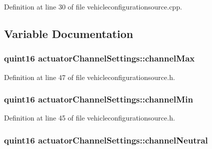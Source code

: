 \-Definition at line 30 of file vehicleconfigurationsource.\-cpp.



\subsection{\-Variable \-Documentation}
\hypertarget{group___vehicle_configuration_source_ga204a4e4648453d51e42ad2b82cb68fa8}{
\subsubsection[{channel\-Max}]{\setlength{\rightskip}{0pt plus 5cm}quint16 {\bf actuator\-Channel\-Settings\-::channel\-Max}}}\label{group___vehicle_configuration_source_ga204a4e4648453d51e42ad2b82cb68fa8}


\-Definition at line 47 of file vehicleconfigurationsource.\-h.

\hypertarget{group___vehicle_configuration_source_ga51bfc85e00becd45e4e622da70ff9d27}{
\subsubsection[{channel\-Min}]{\setlength{\rightskip}{0pt plus 5cm}quint16 {\bf actuator\-Channel\-Settings\-::channel\-Min}}}\label{group___vehicle_configuration_source_ga51bfc85e00becd45e4e622da70ff9d27}


\-Definition at line 45 of file vehicleconfigurationsource.\-h.

\hypertarget{group___vehicle_configuration_source_gac557d0adca6e1ec8f789659c32cfbeff}{
\subsubsection[{channel\-Neutral}]{\setlength{\rightskip}{0pt plus 5cm}quint16 {\bf actuator\-Channel\-Settings\-::channel\-Neutral}}}\label{group___vehicle_configuration_source_gac557d0adca6e1ec8f789659c32cfbeff}


